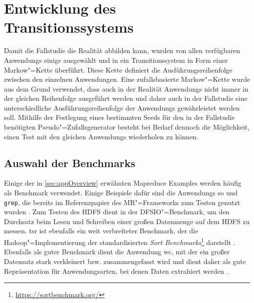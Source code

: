 \section{Entwicklung des Transitionssystems}
\label{sec:transitionsystem}

Damit die Fallstudie die Realität abbilden kann, wurden von allen verfügbaren \glspl{Anwendung} einige ausgewählt und in ein Transitionssystem in Form einer Markow"=Kette überführt.
Diese Kette definiert die Ausführungsreihenfolge zwischen den einzelnen Anwendungen.
Eine zufallsbasierte Markow"=Kette wurde aus dem Grund verwendet, dass auch in der Realität \glspl{Anwendung} nicht immer in der gleichen Reihenfolge ausgeführt werden und daher auch in der Fallstudie eine unterschiedliche Ausführungsreihenfolge der \glspl{Anwendung} gewährleistet werden soll.
Mithilfe der Festlegung eines bestimmten Seeds für den in der Fallstudie benötigten Pseudo"=Zufallsgenerator besteht bei Bedarf dennoch die Möglichkeit, einen \gls{Test} mit den gleichen \glspl{Anwendung} wiederholen zu können.

\subsection{Auswahl der Benchmarks}
\label{subsec:appSelection}

Einige der in \cref{sec:appOverview} erwähnten Mapreduce Examples werden häufig als Benchmark verwendet.
Einige Beispiele dafür sind die \glspl{Anwendung} \acrlong{so} und \texttt{grep}, die bereits im Referenzpapier des \gls{MR}"=Frameworks zum Testen genutzt wurden \cite{Dean2004}.
Zum Testen des \gls{HDFS} dient in \cite{Shvachko2010} der DFSIO"=Benchmark, um den Durchsatz beim Lesen und Schreiben einer großen Datenmenge auf dem \gls{HDFS} zu messen.
\acrlong{tsr} ist ebenfalls ein weit verbreiteter Benchmark, der die Hadoop"=Implementierung der standardisierten \emph{Sort Benchmarks}\footnote{\url{https://sortbenchmark.org/}} darstellt \cite{Graves2013}.
Ebenfalls als guter Benchmark dient die \gls{Anwendung} \acrlong{wc}, mit der ein großer Datensatz stark verkleinert bzw. zusammengefasst wird und dient daher als gute Repräsentation für Anwendungsarten, bei denen Daten extrahiert werden \cite{Huang2010,Chen2012}.


